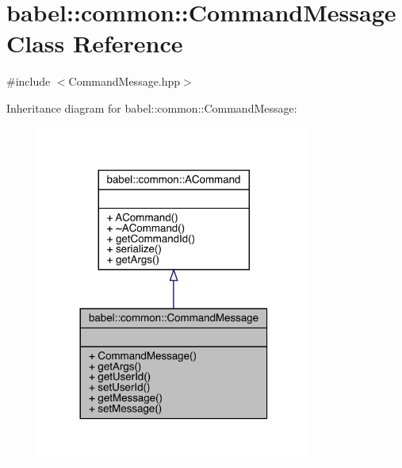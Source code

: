 \hypertarget{classbabel_1_1common_1_1_command_message}{}\section{babel\+:\+:common\+:\+:Command\+Message Class Reference}
\label{classbabel_1_1common_1_1_command_message}


{\ttfamily \#include $<$Command\+Message.\+hpp$>$}



Inheritance diagram for babel\+:\+:common\+:\+:Command\+Message\+:\nopagebreak
\begin{figure}[H]
\begin{center}
\leavevmode
\includegraphics[width=257pt]{classbabel_1_1common_1_1_command_message__inherit__graph}
\end{center}
\end{figure}


